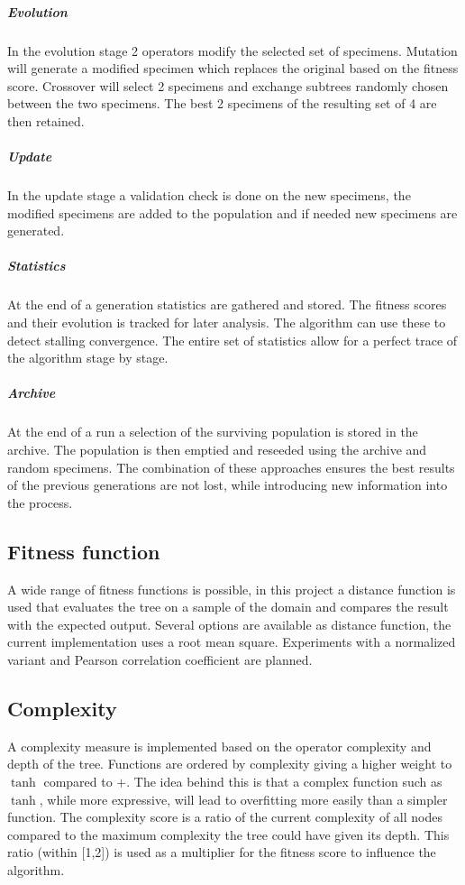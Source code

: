 \documentclass[10pt]{extarticle}
\begin{document}
\subparagraph{Evolution}
In the evolution stage 2 operators modify the selected set of specimens.
Mutation will generate a modified specimen which replaces the original based on the fitness score.
Crossover will select 2 specimens and exchange subtrees randomly chosen between the two specimens. The best 2 specimens of the resulting set of 4 are then retained.

\subparagraph{Update}
In the update stage a validation check is done on the new specimens, the modified specimens are added to the population and if needed new specimens are generated.

\subparagraph{Statistics}
At the end of a generation statistics are gathered and stored. The fitness scores and their evolution is tracked for later analysis.
The algorithm can use these to detect stalling convergence.
The entire set of statistics allow for a perfect trace of the algorithm stage by stage.

\subparagraph{Archive}
At the end of a run a selection of the surviving population is stored in the archive. 
The population is then emptied and reseeded using the archive and random specimens. The combination of these approaches ensures the best results of the previous generations are not lost, while introducing new information into the process.


\subsection{Fitness function}
A wide range of fitness functions is possible, in this project a distance function is used that evaluates the tree on a sample of the domain and compares the result with the expected output. 
Several options are available as distance function, the current implementation uses a root mean square. Experiments with a normalized variant and Pearson correlation coefficient are planned. 

\subsection{Complexity}
A complexity measure is implemented based on the operator complexity and depth of the tree. Functions are ordered by complexity giving a higher weight to $\tanh$ compared to $+$. The idea behind this is that a complex function such as $\tanh$, while more expressive, will lead to overfitting more easily than a simpler function. The complexity score is a ratio of the current complexity of all nodes compared to the maximum complexity the tree could have given its depth. This ratio (within [1,2]) is used as a multiplier for the fitness score to influence the algorithm. 
\end{document}
